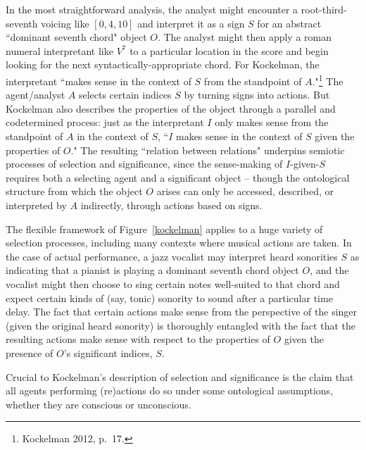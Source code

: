 In the most straightforward analysis, the analyst might encounter a root-third-seventh voicing like $[0,4,10]$ and interpret it as a sign $S$ for an abstract ``dominant seventh chord" object $O$.  The analyst might then apply a roman numeral interpretant like $V^7$ to a particular location in the score and begin looking for the next syntactically-appropriate chord.  For Kockelman, the interpretant ``makes sense in the context of $S$ from the standpoint of $A$."\footnote{Kockelman 2012, p.\ 17.}  The agent/analyst $A$ selects certain indices $S$ by turning signs into actions.  But Kockelman also describes the properties of the object through a parallel and codetermined process: just as the interpretant $I$ only makes sense from the standpoint of $A$ in the context of $S$, ``$I$ makes sense in the context of $S$ given the properties of $O$."  The resulting ``relation between relations" underpins semiotic processes of selection and significance, since the sense-making of $I$-given-$S$ requires both a selecting agent and a significant object -- though the ontological structure from which the object $O$ arises can only be accessed, described, or interpreted by $A$ indirectly, through actions based on signs.

The flexible framework of Figure~\ref{kockelman} applies to a huge variety of selection processes, including many contexts where musical actions are taken.  In the case of actual performance, a jazz vocalist may interpret heard sonorities $S$ as indicating that a pianist is playing a dominant seventh chord object $O$, and the vocalist might then choose to sing certain notes well-suited to that chord and expect certain kinds of (say, tonic) sonority to sound after a particular time delay.  The fact that certain actions make sense from the perspective of the singer (given the original heard sonority) is thoroughly entangled with the fact that the resulting actions make sense with respect to the properties of $O$ given the presence of $O$'s significant indices, $S$.

Crucial to Kockelman's description of selection and significance is the claim that all agents performing (re)actions do so under some ontological assumptions, whether they are conscious or unconscious.  %


 



